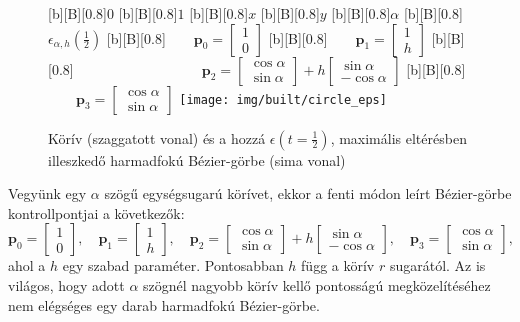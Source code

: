 \documentclass[12pt]{report}
\theoremstyle{definition}
\begin{document}
  \begin{figure}
  [b][B][0.8]{\bf{$0$}}
  [b][B][0.8]{\bf{$1$}}
  [b][B][0.8]{\bf{$x$}}
  [b][B][0.8]{\bf{$y$}}
  [b][B][0.8]{\bf{$\alpha$}}
  [b][B][0.8]{\bf{$\epsilon_{\alpha,h}(\frac{1}{2})$}\qquad}
  [b][B][0.8]{\bf{$\qquad\boldsymbol{p}_0=\begin{bmatrix} 1 \\ 0 \end{bmatrix}$}}
  [b][B][0.8]{\bf{$\qquad\boldsymbol{p}_1=\begin{bmatrix} 1 \\ h \end{bmatrix}$}}
  [b][B][0.8]{\bf{$\hspace{3cm}\qquad\boldsymbol{p}_2=\begin{bmatrix}\cos\alpha\\ \sin\alpha
                              \end{bmatrix} + h \begin{bmatrix} \sin\alpha \\
                              -\cos\alpha \end{bmatrix}$}}
  [b][B][0.8]{\bf{$\qquad\boldsymbol{p}_3=\begin{bmatrix}\cos\alpha\\ \sin\alpha
                              \end{bmatrix}$}}
    \centering
    \texttt{[image: img/built/circle\_eps]}
    \caption{\label{fig:circle} Körív (szaggatott vonal) és a hozzá
    $\epsilon(t=\frac{1}{2})$, maximális eltérésben illeszkedő harmadfokú
    Bézier-görbe (sima vonal)}
  \end{figure}

Vegyünk egy $\alpha$ szögű egységsugarú körívet, ekkor a fenti módon leírt
Bézier-görbe kontrollpontjai a következők:
\[\boldsymbol{p}_0 = \begin{bmatrix} 1 \\ 0 \end{bmatrix},\quad
  \boldsymbol{p}_1 = \begin{bmatrix} 1 \\ h \end{bmatrix},\quad
  \boldsymbol{p}_2 = \begin{bmatrix} \cos\alpha \\ \sin\alpha \end{bmatrix} + h
        \begin{bmatrix} \sin\alpha \\ -\cos\alpha \end{bmatrix},\quad
  \boldsymbol{p}_3 = \begin{bmatrix} \cos\alpha \\ \sin\alpha \end{bmatrix}, \]
ahol a $h$ egy szabad paraméter. Pontosabban $h$ függ a körív $r$ sugarától.
Az is világos, hogy adott $\alpha$ szögnél nagyobb körív kellő pontosságú
megközelítéséhez nem elégséges egy darab harmadfokú Bézier-görbe.
\end{document}
